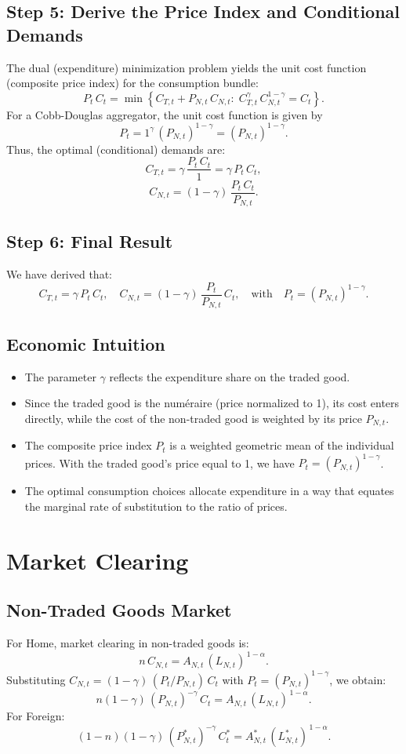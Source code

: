 \documentclass[a4paper,12pt]{article} %
\theoremstyle{nonitalic}
\begin{document}
\subsection*{Step 5: Derive the Price Index and Conditional Demands}
The dual (expenditure) minimization problem yields the unit cost function (composite price index) for the consumption bundle:
\[
P_t\,C_t = \min \left\{ C_{T,t} + P_{N,t}\,C_{N,t} : \; C_{T,t}^{\gamma}\,C_{N,t}^{1-\gamma} = C_t \right\}.
\]
For a Cobb-Douglas aggregator, the unit cost function is given by
\[
P_t = 1^{\gamma}\,(P_{N,t})^{1-\gamma} = (P_{N,t})^{1-\gamma}.
\]
Thus, the optimal (conditional) demands are:
\[
C_{T,t} = \gamma\,\frac{P_t\,C_t}{1} = \gamma\,P_t\,C_t,
\]
\[
C_{N,t} = (1-\gamma)\,\frac{P_t\,C_t}{P_{N,t}}.
\]

\subsection*{Step 6: Final Result}
We have derived that:
\[
\boxed{C_{T,t} = \gamma\,P_t\,C_t,\quad C_{N,t} = (1-\gamma)\,\frac{P_t}{P_{N,t}}\,C_t,\quad \text{with} \quad P_t = (P_{N,t})^{1-\gamma}.}
\]

\subsection*{Economic Intuition}
\begin{itemize}
    \item The parameter $\gamma$ reflects the expenditure share on the traded good.
    \item Since the traded good is the num\'eraire (price normalized to 1), its cost enters directly, while the cost of the non-traded good is weighted by its price $P_{N,t}$.
    \item The composite price index $P_t$ is a weighted geometric mean of the individual prices. With the traded good’s price equal to 1, we have $P_t = (P_{N,t})^{1-\gamma}$.
    \item The optimal consumption choices allocate expenditure in a way that equates the marginal rate of substitution to the ratio of prices.
\end{itemize}

\section{Market Clearing}

\subsection*{Non-Traded Goods Market}
For Home, market clearing in non-traded goods is:
\[
n\,C_{N,t} = A_{N,t}\,(L_{N,t})^{\,1-\alpha}.
\]
Substituting \( C_{N,t} = (1-\gamma)\,(P_t/P_{N,t})\,C_t \) with \( P_t = (P_{N,t})^{1-\gamma} \), we obtain:
\[
\boxed{n(1-\gamma)\,(P_{N,t})^{-\gamma}\,C_t = A_{N,t}\,(L_{N,t})^{\,1-\alpha}.}
\]
For Foreign:
\[
\boxed{(1-n)(1-\gamma)\,(P^*_{N,t})^{-\gamma}\,C^*_t = A^*_{N,t}\,(L^*_{N,t})^{\,1-\alpha}.}
\]
\end{document}
